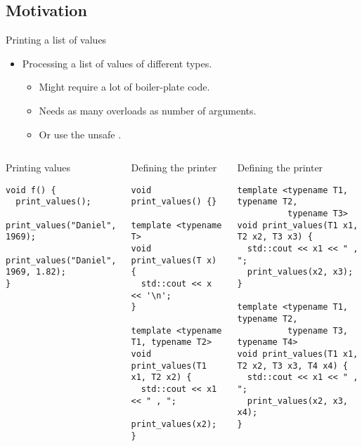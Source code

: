 \subsection{Motivation}

\begin{frame}[t,fragile]{Printing a list of values}
\begin{itemize}
  \item Processing a list of values of different types.
    \begin{itemize}
      \item Might require a lot of boiler-plate code.
      \item Needs as many overloads as number of arguments.
      \item Or use the unsafe .
    \end{itemize}
\end{itemize}

\begin{columns}[T]

\pause
{}
\begin{block}{Printing values}
\begin{lstlisting}
void f() {
  print_values();
  print_values("Daniel", 1969);
  print_values("Daniel", 1969, 1.82);
}
\end{lstlisting}
\end{block}

\pause
{}
\begin{block}{Defining the printer}
\begin{lstlisting}[basicstyle=\mode<presentation>{\tiny}]
void print_values() {}

template <typename T>
void print_values(T x) {
  std::cout << x << '\n';
}

template <typename T1, typename T2>
void print_values(T1 x1, T2 x2) {
  std::cout << x1 << " , ";
  print_values(x2);
}
\end{lstlisting}
\end{block}

\begin{block}{Defining the printer}
\begin{lstlisting}[basicstyle=\mode<presentation>{\tiny}]
template <typename T1, typename T2, 
          typename T3>
void print_values(T1 x1, T2 x2, T3 x3) {
  std::cout << x1 << " , ";
  print_values(x2, x3);
}

template <typename T1, typename T2, 
          typename T3, typename T4>
void print_values(T1 x1, T2 x2, T3 x3, T4 x4) {
  std::cout << x1 << " , ";
  print_values(x2, x3, x4);
}
\end{lstlisting}
\end{block}

\end{columns}
\end{frame}

